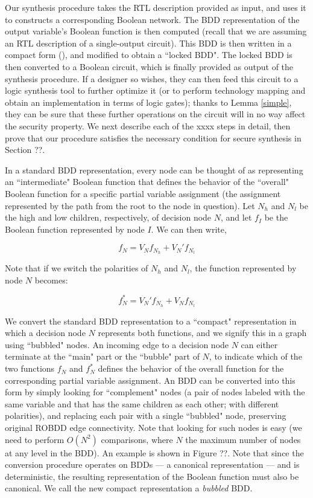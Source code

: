 Our synthesis procedure takes the RTL description provided as input, and uses it to constructs a corresponding Boolean network. The BDD representation of the output variable's Boolean function is then computed (recall that we are assuming an RTL description of a single-output circuit). This BDD is then written in a compact form (), and modified to obtain a ``locked BDD". The locked BDD is then converted to a Boolean circuit, which is finally provided as output of the synthesis procedure. If a designer so wishes, they can then feed this circuit to a logic synthesis tool to further optimize it (or to perform technology mapping and obtain an implementation in terms of logic gates); thanks to Lemma \ref{simple}, they can be sure that these further operations on the circuit will in no way affect the security property.  We next describe each of the xxxx steps in detail, then prove that our procedure satisfies the necessary condition for secure synthesis in Section ??.

In a standard BDD representation, every node can be thought of as representing an ``intermediate" Boolean function that defines the behavior of the ``overall" Boolean function for a specific partial variable assignment (the assignment represented by the path from the root to the node in question). Let $N_h$ and $N_l$ be the high and low children, respectively, of decision node $N$, and let $f_{I}$ be the Boolean function represented by node $I$.  We can then write,

\[f_N=V_N f_{N_h}+V_N' f_{N_l}\]

Note that if we switch the polarities of $N_h$ and $N_l$, the function represented by node $N$ becomes:

\[f_N^*=V_N' f_{N_h}+V_N f_{N_l}\]

We convert the standard BDD representation to a ``compact" representation in which a decision node $N$ represents both functions, and we signify this in a graph using ``bubbled" nodes. An incoming edge to a decision node $N$ can either terminate at the ``main" part or the ``bubble" part of $N$, to indicate which of the two functions $f_N$ and $f_N^*$ defines the behavior of the overall function for the corresponding partial variable assignment. An BDD can be converted into this form by simply looking for ``complement" nodes (a pair of nodes labeled with the same variable and that has the same children as each other; with different polarities), and replacing each pair with a single ``bubbled" node, preserving original ROBDD edge connectivity. Note that looking for such nodes is easy (we need to perform $O(N^2)$ comparisons, where $N$ the maximum number of nodes at any level in the BDD). An example is shown in Figure ??. Note that since the conversion procedure operates on BDDs --- a canonical representation --- and is deterministic, the resulting representation of the Boolean function must also be canonical. We call the new compact representation a \emph{bubbled} BDD.


